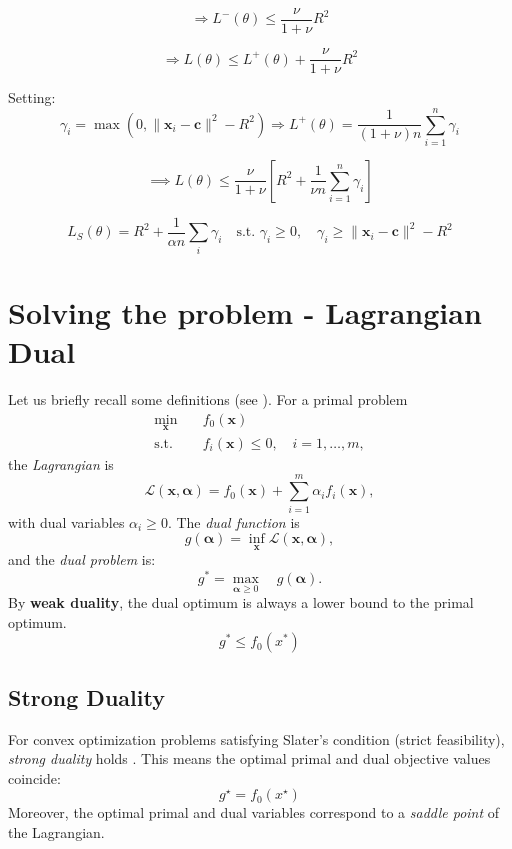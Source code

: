 \documentclass[11pt]{report}
\begin{document}
\[
\Rightarrow L^-(\theta) \leq \frac{\nu}{1+\nu} R^2
\]

\[
\Rightarrow L(\theta) \leq L^+(\theta) + \frac{\nu}{1+\nu} R^2
\]


Setting:
\[
\gamma_i = \max(0, \|\boldsymbol{x}_i - \boldsymbol{c}\|^2 - R^2)
\Rightarrow
L^+(\theta) = \frac{1}{(1+\nu)n}\sum _{i=1} ^n \gamma_i
\]

\[
\implies L(\theta) \leq \frac{\nu}{1+\nu}\left[ R^2 + \frac{1}{\nu n} \sum_{i=1}^n \gamma_i \right]
\]

\[
L_S(\theta) = R^2 + \frac{1}{\alpha n} \sum_i \gamma_i \quad \text{s.t. } \gamma_i \geq 0,\quad \gamma_i \geq \|\boldsymbol{x}_i - \boldsymbol{c}\|^2 - R^2
\]

\section{Solving the problem - Lagrangian Dual}
Let us briefly recall some definitions (see \cite[Ch.~5]{boyd2004convex}).  
For a primal problem
\begin{align*}
\min_{\mathbf{x}} \quad & f_0(\mathbf{x}) \\
\text{s.t.} \quad & f_i(\mathbf{x}) \leq 0, \quad i=1,\dots,m,
\end{align*}
the \emph{Lagrangian} is
\[
\mathcal{L}(\mathbf{x}, \boldsymbol{\alpha}) = f_0(\mathbf{x}) + \sum_{i=1}^m \alpha_i f_i(\mathbf{x}),
\]
with dual variables $\alpha_i \geq 0$.  
The \emph{dual function} is
\[
g(\boldsymbol{\alpha}) = \inf_{\mathbf{x}} \mathcal{L}(\mathbf{x}, \boldsymbol{\alpha}),
\]
and the \emph{dual problem} is:
\[
g^* = \max_{\boldsymbol{\alpha} \ge 0} \quad g(\boldsymbol{\alpha}).
\]
By \textbf{weak duality}, the dual optimum is always a lower bound to the primal optimum.  
$$g^* \le f_0(x^*)$$

\subsection{Strong Duality}
For convex optimization problems satisfying Slater's condition (strict feasibility), \emph{strong duality} holds \cite[Section~5.3]{boyd2004convex}.  
This means the optimal primal and dual objective values coincide:
\[
g^\star = f_0(x^\star)
\]
Moreover, the optimal primal and dual variables correspond to a \emph{saddle point} of the Lagrangian.
\end{document}
